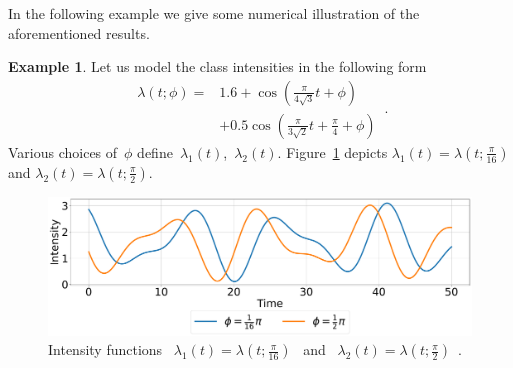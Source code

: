 \documentclass[lettersize,journal,onecolumn]{IEEEtran}
\theoremstyle{definition}
\newtheorem{example}{Example}
\newcommand{\figurewidth}{0.5\columnwidth}  %
\renewcommand{\figurename}{Figure}
\begin{document}
In the following example we give some numerical illustration of the aforementioned
results.
\begin{example}
	\label{example:3}
	Let us model the class intensities in the following form
	\begin{equation}
		\begin{split}
			\lambda(t;\phi) = {}
			& 1.6+\cos\left(\frac{\pi}{4\sqrt{3}}t+\phi\right) \\
			&+ 0.5\cos\left(\frac{\pi}{3\sqrt{2}}t+\frac{\pi}{4} + \phi\right)
		\end{split}
		\label{eqn:sim1} \,.
	\end{equation}
	Various choices of~$\phi$ define~$\lambda_{1}(t)$,~$\lambda_{2}(t)$. 
	\figurename~\ref{fig:03_bayes_bounds/risk/intensity} depicts 
	\mbox{$\lambda_{1}(t)=\lambda\left(t; \frac{\pi}{16}\right)$} and 
	\mbox{$\lambda_{2}(t)=\lambda\left(t; \frac{\pi}{2}\right)$}.
	
	\begin{figure}[!t]
		\includegraphics[width=\figurewidth]{pawla1}
		\centering
		\caption{Intensity functions \mbox{
				$\lambda_{1}(t)=\lambda\left(t; \frac{\pi}{16}\right)$
			} and \mbox{
				$\lambda_{2}(t)=\lambda\left(t; \frac{\pi}{2}\right)$
			}.
		}
		\label{fig:03_bayes_bounds/risk/intensity}
	\end{figure}
	

\end{example}
\end{document}
